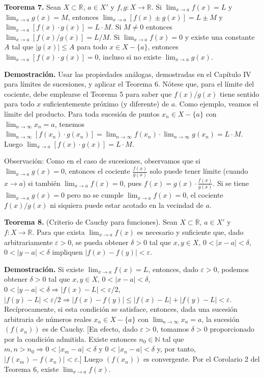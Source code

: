 \documentclass[12pt,oneside]{book}
\begin{document}
\textbf{Teorema 7.} Sean \(X \subset \mathbb{R}\), \(a \in X'\) y \(f, g: X \to \mathbb{R}\). Si \(\lim_{x \to a} f(x) = L\) y \(\lim_{x \to a} g(x) = M\), entonces \(\lim_{x \to a} [f(x) \pm g(x)] = L \pm M\) y \(\lim_{x \to a} [f(x) \cdot g(x)] = L \cdot M\). Si \(M \neq 0\) entonces \(\lim_{x \to a} [f(x)/g(x)] = L/M\). Si \(\lim_{x \to a} f(x) = 0\) y existe una constante \(A\) tal que \(|g(x)| \leq A\) para todo \(x \in X - \{a\}\), entonces \(\lim_{x \to a} [f(x) \cdot g(x)] = 0\), incluso si no existe \(\lim_{x \to a} g(x)\).

\textbf{Demostración.} Usar las propiedades análogas, demostradas en el Capítulo IV para límites de sucesiones, y aplicar el Teorema 6. Nótese que, para el límite del cociente, debe emplearse el Teorema 5 para saber que \(f(x)/g(x)\) tiene sentido para todo \(x\) suficientemente próximo (y diferente) de \(a\). Como ejemplo, veamos el límite del producto. Para toda sucesión de puntos \(x_n \in X - \{a\}\) con \(\lim_{n \to \infty} x_n = a\), tenemos \(\lim_{n \to \infty} [f(x_n) \cdot g(x_n)] = \lim_{n \to \infty} f(x_n) \cdot \lim_{n \to \infty} g(x_n) = L \cdot M\). Luego \(\lim_{x \to a} [f(x) \cdot g(x)] = L \cdot M\).

Observación: Como en el caso de sucesiones, observamos que si \(\lim_{x \to a} g(x) = 0\), entonces el cociente \(\frac{f(x)}{g(x)}\) solo puede tener límite (cuando \(x \to a\)) si también \(\lim_{x \to a} f(x) = 0\), pues \(f(x) = g(x) \cdot \frac{f(x)}{g(x)}\). Si se tiene \(\lim_{x \to a} g(x) = 0\) pero no se cumple \(\lim_{x \to a} f(x) = 0\), el cociente \(f(x)/g(x)\) ni siquiera puede estar acotado en la vecindad de \(a\).

\textbf{Teorema 8.} (Criterio de Cauchy para funciones). Sean \(X \subset \mathbb{R}\), \(a \in X'\) y \(f: X \to \mathbb{R}\). Para que exista \(\lim_{x \to a} f(x)\) es necesario y suficiente que, dado arbitrariamente \(\varepsilon > 0\), se pueda obtener \(\delta > 0\) tal que \(x, y \in X\), \(0 < |x - a| < \delta\), \(0 < |y - a| < \delta\) impliquen \(|f(x) - f(y)| < \varepsilon\).

\textbf{Demostración.} Si existe \(\lim_{x \to a} f(x) = L\), entonces, dado \(\varepsilon > 0\), podemos obtener \(\delta > 0\) tal que \(x, y \in X\), \(0 < |x - a| < \delta\), \(0 < |y - a| < \delta \Rightarrow |f(x) - L| < \varepsilon/2\), \(|f(y) - L| < \varepsilon/2 \Rightarrow |f(x) - f(y)| \leq |f(x) - L| + |f(y) - L| < \varepsilon\). Recíprocamente, si esta condición se satisface, entonces, dada una sucesión arbitraria de números reales \(x_n \in X - \{a\}\) con \(\lim_{n \to \infty} x_n = a\), la sucesión \((f(x_n))\) es de Cauchy. [En efecto, dado \(\varepsilon > 0\), tomamos \(\delta > 0\) proporcionado por la condición admitida. Existe entonces \(n_0 \in \mathbb{N}\) tal que \(m, n > n_0 \Rightarrow 0 < |x_m - a| < \delta\) y \(0 < |x_n - a| < \delta\) y, por tanto, \(|f(x_m) - f(x_n)| < \varepsilon\).] Luego \((f(x_n))\) es convergente. Por el Corolario 2 del Teorema 6, existe \(\lim_{x \to a} f(x)\).
\end{document}
